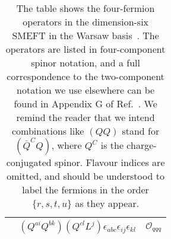 \begin{table}
\begin{center}
\begin{tabular}{cclccl}
      &
        \multicolumn{4}{r}{
        $ (Q^{ai} Q^{bk}) (Q^{cl} L^{j}) \epsilon_{abc} \epsilon_{ij} \epsilon_{kl}$} &
                                                                                        $\mathcal{O}_{qqq}$ \\[1mm]
      \bottomrule
    \end{tabular}
    \caption[The table shows the four-fermion operators in the dimension-six
    SMEFT in the Warsaw basis~\cite{Buchmuller:1985jz, Grzadkowski:2010es}.]{The
      table shows the four-fermion operators in the dimension-six SMEFT in the
      Warsaw basis~\cite{Buchmuller:1985jz, Grzadkowski:2010es}. The operators
      are listed in four-component spinor notation, and a full correspondence to
      the two-component notation we use elsewhere can be found in Appendix G of
      Ref.~\cite{Dreiner:2008tw}. We remind the reader that we intend
      combinations like $(Q Q)$ stand for $(\bar{Q}^{C} Q)$, where $Q^{C}$ is
      the charge-conjugated spinor. Flavour indices are omitted, and should be
      understood to label the fermions in the order $\{r, s, t, u\}$ as they
      appear. \label{tab:ch1-smeft-d6-psi4}}
  \end{center}
\end{table}

